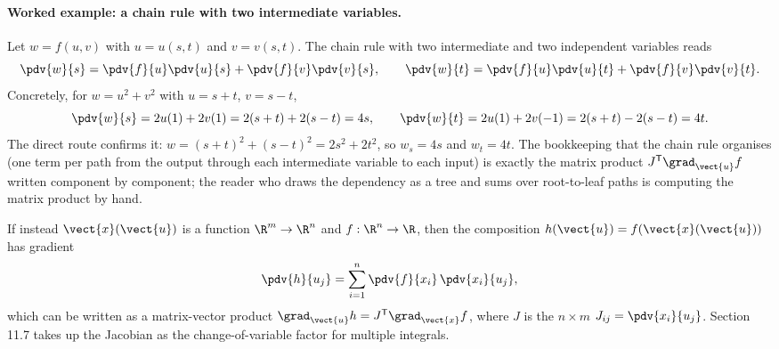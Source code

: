 \paragraph{Worked example: a chain rule with two intermediate
variables.} Let $w = f(u, v)$ with $u = u(s, t)$ and $v = v(s, t)$.
The chain rule with two intermediate and two independent variables
reads
\[
\pdv{w}{s} = \pdv{f}{u}\pdv{u}{s} + \pdv{f}{v}\pdv{v}{s},
\qquad
\pdv{w}{t} = \pdv{f}{u}\pdv{u}{t} + \pdv{f}{v}\pdv{v}{t}.
\]
Concretely, for $w = u^{2} + v^{2}$ with $u = s + t$, $v = s - t$,
\[
\pdv{w}{s} = 2u(1) + 2v(1) = 2(s + t) + 2(s - t) = 4s,
\qquad
\pdv{w}{t} = 2u(1) + 2v(-1) = 2(s + t) - 2(s - t) = 4t.
\]
The direct route confirms it: $w = (s + t)^{2} + (s - t)^{2} =
2s^{2} + 2t^{2}$, so $w_{s} = 4s$ and $w_{t} = 4t$. The bookkeeping
that the chain rule organises (one term per path from the output
through each intermediate variable to each input) is exactly the
matrix product $J^{\mathsf{T}}\grad_{\vect{u}} f$ written component
by component; the reader who draws the dependency as a tree and sums
over root-to-leaf paths is computing the matrix product by hand.

If instead $\vect{x}(\vect{u})$ is a function $\R^{m} \to \R^{n}$
and $f : \R^{n} \to \R$, then the composition $h(\vect{u}) =
f(\vect{x}(\vect{u}))$ has gradient
\[
\pdv{h}{u_{j}} = \sum_{i = 1}^{n} \pdv{f}{x_{i}}\,\pdv{x_{i}}{u_{j}},
\]
which can be written as a matrix-vector product $\grad_{\vect{u}} h
= J^{\mathsf{T}} \grad_{\vect{x}} f$, where $J$ is the $n \times m$
 $J_{ij} = \pdv{x_{i}}{u_{j}}$. Section 11.7
takes up the Jacobian as the change-of-variable factor for multiple
integrals.

